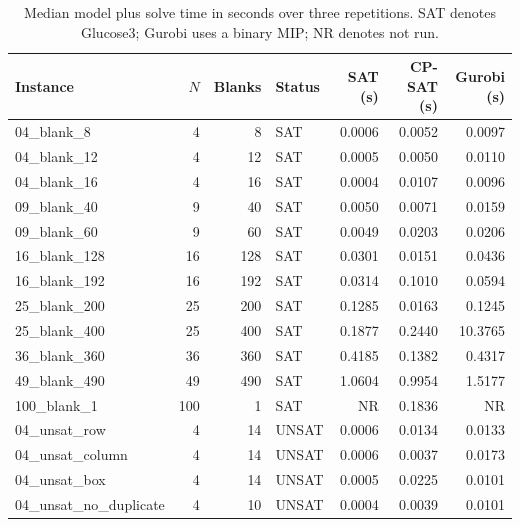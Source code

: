 \begin{table}[!htbp]
\caption{Median model plus solve time in seconds over three repetitions. SAT denotes Glucose3; Gurobi uses a binary MIP; NR denotes not run.}
\label{tab:results}
\centering
\begin{tabular}{lrrlrrr}
\toprule
Instance & $N$ & Blanks & Status & SAT (s) & CP-SAT (s) & Gurobi (s) \\
\midrule
04\_blank\_8 & 4 & 8 & SAT & 0.0006 & 0.0052 & 0.0097 \\
04\_blank\_12 & 4 & 12 & SAT & 0.0005 & 0.0050 & 0.0110 \\
04\_blank\_16 & 4 & 16 & SAT & 0.0004 & 0.0107 & 0.0096 \\
09\_blank\_40 & 9 & 40 & SAT & 0.0050 & 0.0071 & 0.0159 \\
09\_blank\_60 & 9 & 60 & SAT & 0.0049 & 0.0203 & 0.0206 \\
16\_blank\_128 & 16 & 128 & SAT & 0.0301 & 0.0151 & 0.0436 \\
16\_blank\_192 & 16 & 192 & SAT & 0.0314 & 0.1010 & 0.0594 \\
25\_blank\_200 & 25 & 200 & SAT & 0.1285 & 0.0163 & 0.1245 \\
25\_blank\_400 & 25 & 400 & SAT & 0.1877 & 0.2440 & 10.3765 \\
36\_blank\_360 & 36 & 360 & SAT & 0.4185 & 0.1382 & 0.4317 \\
49\_blank\_490 & 49 & 490 & SAT & 1.0604 & 0.9954 & 1.5177 \\
100\_blank\_1 & 100 & 1 & SAT & NR & 0.1836 & NR \\
04\_unsat\_row & 4 & 14 & UNSAT & 0.0006 & 0.0134 & 0.0133 \\
04\_unsat\_column & 4 & 14 & UNSAT & 0.0006 & 0.0037 & 0.0173 \\
04\_unsat\_box & 4 & 14 & UNSAT & 0.0005 & 0.0225 & 0.0101 \\
04\_unsat\_no\_duplicate & 4 & 10 & UNSAT & 0.0004 & 0.0039 & 0.0101 \\
\bottomrule
\end{tabular}
\end{table}
